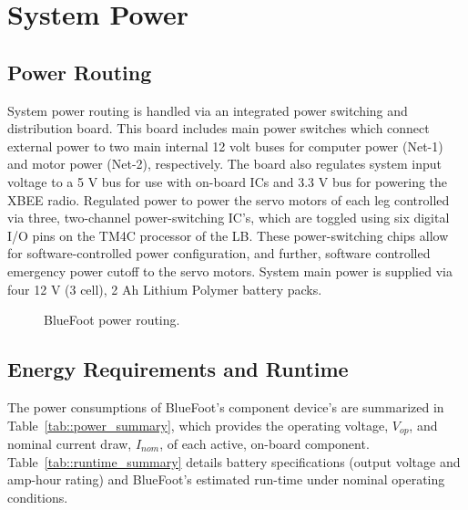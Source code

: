 	\section{System Power}

		\subsection{Power Routing}

			System power routing is handled via an integrated power switching and distribution board. This board includes main power switches which connect external power to two main internal 12 volt buses for  computer power (Net-1) and motor power (Net-2), respectively. The board also regulates system input voltage to a 5 V bus for use with on-board ICs and 3.3 V bus for powering the XBEE radio. Regulated power to power the servo motors of each leg controlled via three, two-channel power-switching IC's, which are toggled using six digital I/O pins on the TM4C processor of the LB. These power-switching chips allow for software-controlled power configuration, and further, software controlled emergency power cutoff to the servo motors. System main power is supplied via four 12 V (3 cell), 2 Ah Lithium Polymer battery packs.
				\begin{figure}[h!]
					\centering
					\caption{BlueFoot power routing.}
					\label{fig::dev_diagram}
				\end{figure}
		
			\newpage
			\subsection{Energy Requirements and Runtime}

			
			The power consumptions of BlueFoot's component device's are summarized in Table~\ref{tab::power_summary}, which provides the operating voltage, $V_{op}$, and nominal current draw, $I_{nom}$, of each active, on-board component. Table~\ref{tab::runtime_summary} details battery specifications (output voltage and amp-hour rating) and BlueFoot's estimated run-time under nominal operating conditions.
		
